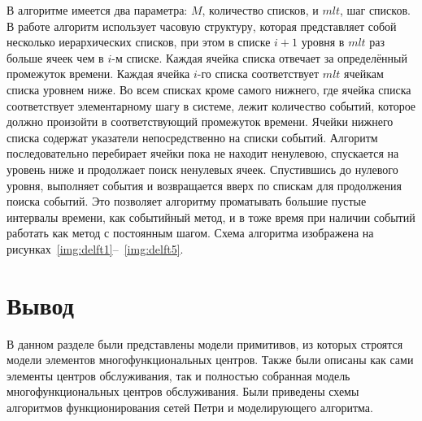 В алгоритме имеется два параметра: $M$, количество списков, и $mlt$, шаг списков. В работе алгоритм использует часовую структуру, которая представляет собой несколько иерархических списков, при этом в списке  $i + 1$ уровня в $mlt$ раз больше ячеек чем в $i$-м списке. Каждая ячейка списка отвечает за определённый промежуток времени. Каждая ячейка $i$-го списка соответствует $mlt$ ячейкам списка уровнем ниже. Во всем списках кроме самого нижнего, где ячейка списка соответствует элементарному шагу в системе, лежит количество событий, которое должно произойти в соответствующий промежуток времени. Ячейки нижнего списка содержат указатели непосредственно на списки событий. Алгоритм последовательно перебирает ячейки пока не находит ненулевою, спускается на уровень ниже и продолжает поиск ненулевых ячеек. Спустившись до нулевого уровня, выполняет события и возвращается вверх по спискам для продолжения поиска событий. Это позволяет алгоритму проматывать большие пустые интервалы времени, как событийный метод, и в тоже время при наличии событий работать как метод с постоянным шагом. Схема алгоритма изображена на рисунках~\ref{img:delft1}--~\ref{img:delft5}.

\FloatBarrier

\FloatBarrier

\FloatBarrier

\FloatBarrier

\FloatBarrier

\section*{Вывод}

В данном разделе были представлены модели примитивов, из которых строятся модели элементов многофункциональных центров. Также были описаны как сами элементы центров обслуживания, так и полностью собранная модель  многофункциональных центров обслуживания. Были приведены схемы алгоритмов функционирования сетей Петри и моделирующего алгоритма. 